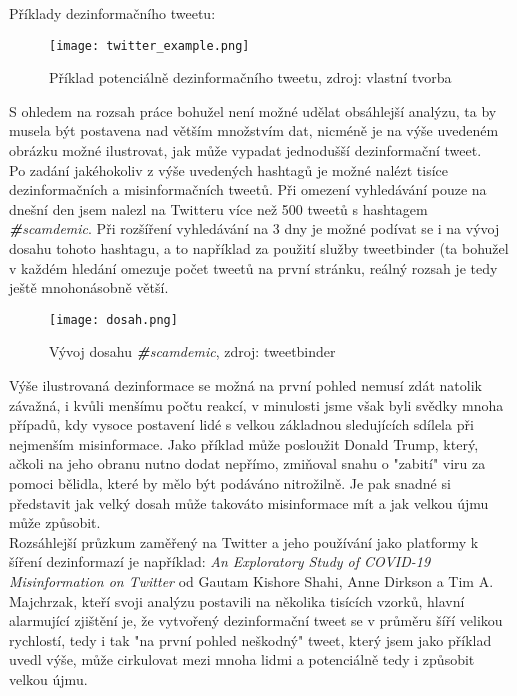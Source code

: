Příklady dezinformačního tweetu:\\

\begin{figure}[htbp]
  \centering
  \texttt{[image: twitter\_example.png]}
  \caption{Příklad potenciálně dezinformačního tweetu, zdroj: vlastní tvorba}
  \label{fig:twitter example}
\end{figure}

S ohledem na rozsah práce bohužel není možné udělat obsáhlejší analýzu, ta by musela být postavena nad větším množstvím dat, nicméně je na výše uvedeném obrázku možné ilustrovat, jak může vypadat jednodušší dezinformační tweet.\\

Po zadání jakéhokoliv z výše uvedených hashtagů je možné nalézt tisíce dezinformačních a misinformačních tweetů. Při omezení vyhledávání pouze na dnešní den jsem nalezl na Twitteru více než 500 tweetů s hashtagem \textit{\textbf{\#}scamdemic}. Při rozšíření vyhledávání na 3 dny je možné podívat se i na vývoj dosahu tohoto hashtagu, a to například za použití služby tweetbinder (ta bohužel v každém hledání omezuje počet tweetů na první stránku, reálný rozsah je tedy ještě mnohonásobně větší.\\

\begin{figure}[htbp]
  \centering
  \texttt{[image: dosah.png]}
  \caption{Vývoj dosahu \textit{\textbf{\#}scamdemic}, zdroj: tweetbinder}
  \label{fig:twitter dosah}
\end{figure}

Výše ilustrovaná dezinformace se možná na první pohled nemusí zdát natolik závažná, i kvůli menšímu počtu reakcí, v minulosti jsme však byli svědky mnoha případů, kdy vysoce postavení lidé s velkou základnou sledujících sdílela při nejmenším misinformace. Jako příklad může posloužit Donald Trump, který, ačkoli na jeho obranu nutno dodat nepřímo, zmiňoval snahu o "zabití" viru za pomoci bělidla, které by mělo být podáváno nitrožilně\cite{noauthor_coronavirus_2020}. Je pak snadné si představit jak velký dosah může takováto misinformace mít a jak velkou újmu může způsobit.\\


Rozsáhlejší průzkum zaměřený na Twitter a jeho používání jako platformy k šíření dezinformazí je například: \textit{An Exploratory Study of COVID-19 Misinformation on Twitter} od Gautam Kishore Shahi, Anne Dirkson a Tim A. Majchrzak, kteří svoji analýzu postavili na několika tisících vzorků\cite{shahi_exploratory_2020}, hlavní alarmující zjištění je, že vytvořený dezinformační tweet se v průměru šíří velikou rychlostí, tedy i tak "na první pohled neškodný" tweet, který jsem jako příklad uvedl výše, může cirkulovat mezi mnoha lidmi a potenciálně tedy i způsobit velkou újmu.\\

